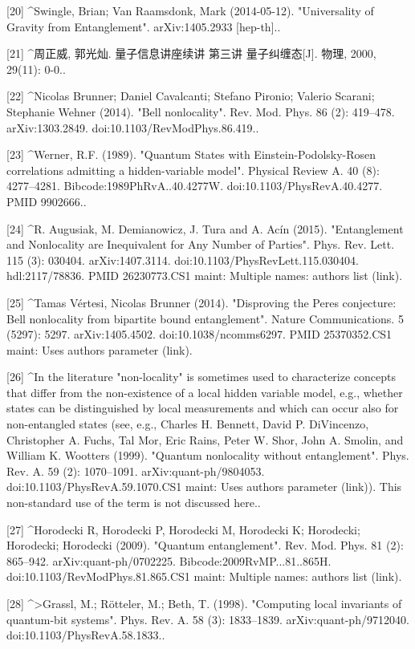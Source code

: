 [20]
^Swingle, Brian; Van Raamsdonk, Mark (2014-05-12). "Universality of Gravity from Entanglement". arXiv:1405.2933 [hep-th]..

[21]
^周正威, 郭光灿. 量子信息讲座续讲 第三讲 量子纠缠态[J]. 物理, 2000, 29(11): 0-0..

[22]
^Nicolas Brunner; Daniel Cavalcanti; Stefano Pironio; Valerio Scarani; Stephanie Wehner (2014). "Bell nonlocality". Rev. Mod. Phys. 86 (2): 419–478. arXiv:1303.2849. doi:10.1103/RevModPhys.86.419..

[23]
^Werner, R.F. (1989). "Quantum States with Einstein-Podolsky-Rosen correlations admitting a hidden-variable model". Physical Review A. 40 (8): 4277–4281. Bibcode:1989PhRvA..40.4277W. doi:10.1103/PhysRevA.40.4277. PMID 9902666..

[24]
^R. Augusiak, M. Demianowicz, J. Tura and A. Acín (2015). "Entanglement and Nonlocality are Inequivalent for Any Number of Parties". Phys. Rev. Lett. 115 (3): 030404. arXiv:1407.3114. doi:10.1103/PhysRevLett.115.030404. hdl:2117/78836. PMID 26230773.CS1 maint: Multiple names: authors list (link).

[25]
^Tamas Vértesi, Nicolas Brunner (2014). "Disproving the Peres conjecture: Bell nonlocality from bipartite bound entanglement". Nature Communications. 5 (5297): 5297. arXiv:1405.4502. doi:10.1038/ncomms6297. PMID 25370352.CS1 maint: Uses authors parameter (link).

[26]
^In the literature "non-locality" is sometimes used to characterize concepts that differ from the non-existence of a local hidden variable model, e.g., whether states can be distinguished by local measurements and which can occur also for non-entangled states (see, e.g., Charles H. Bennett, David P. DiVincenzo, Christopher A. Fuchs, Tal Mor, Eric Rains, Peter W. Shor, John A. Smolin, and William K. Wootters (1999). "Quantum nonlocality without entanglement". Phys. Rev. A. 59 (2): 1070–1091. arXiv:quant-ph/9804053. doi:10.1103/PhysRevA.59.1070.CS1 maint: Uses authors parameter (link)). This non-standard use of the term is not discussed here..

[27]
^Horodecki R, Horodecki P, Horodecki M, Horodecki K; Horodecki; Horodecki; Horodecki (2009). "Quantum entanglement". Rev. Mod. Phys. 81 (2): 865–942. arXiv:quant-ph/0702225. Bibcode:2009RvMP...81..865H. doi:10.1103/RevModPhys.81.865.CS1 maint: Multiple names: authors list (link).

[28]
^>Grassl, M.; Rötteler, M.; Beth, T. (1998). "Computing local invariants of quantum-bit systems". Phys. Rev. A. 58 (3): 1833–1839. arXiv:quant-ph/9712040. doi:10.1103/PhysRevA.58.1833..

